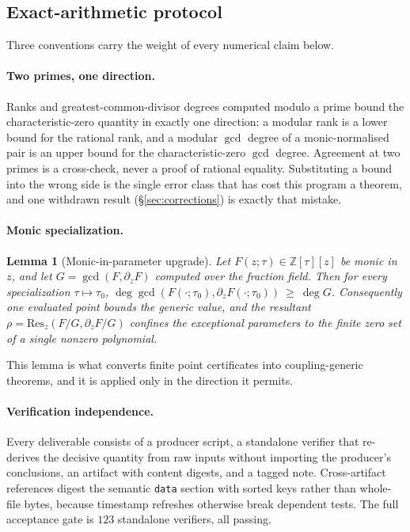 \documentclass[11pt]{article}
\newtheorem{lemma}[theorem]{Lemma}
\theoremstyle{definition}
\newcommand{\Zb}{\mathbb{Z}}
\begin{document}
\subsection{Exact-arithmetic protocol}\label{sec:protocol}
Three conventions carry the weight of every numerical claim below.

\paragraph{Two primes, one direction.}
Ranks and greatest-common-divisor degrees computed modulo a prime bound the characteristic-zero
quantity in exactly one direction: a modular rank is a lower bound for the rational rank, and a
modular $\gcd$ degree of a monic-normalised pair is an upper bound for the characteristic-zero
$\gcd$ degree. Agreement at two primes is a cross-check, never a proof of rational equality.
Substituting a bound into the wrong side is the single error class that has cost this program a
theorem, and one withdrawn result (\S\ref{sec:corrections}) is exactly that mistake.

\paragraph{Monic specialization.}
\begin{lemma}[Monic-in-parameter upgrade]\label{lem:monic}
Let $F(z;\tau)\in\Zb[\tau][z]$ be monic in $z$, and let $G=\gcd(F,\partial_zF)$ computed over the
fraction field. Then for every specialization $\tau\mapsto\tau_0$, $\deg\gcd(F(\cdot;\tau_0),
\partial_zF(\cdot;\tau_0))\ \ge\ \deg G$. Consequently one evaluated point bounds the generic value,
and the resultant $\rho=\mathrm{Res}_z(F/G,\partial_zF/G)$ confines the exceptional parameters to the
finite zero set of a single nonzero polynomial.
\end{lemma}
This lemma is what converts finite point certificates into coupling-generic theorems, and it is
applied only in the direction it permits.

\paragraph{Verification independence.}
Every deliverable consists of a producer script, a standalone verifier that re-derives the decisive
quantity from raw inputs without importing the producer's conclusions, an artifact with content
digests, and a tagged note. Cross-artifact references digest the semantic \texttt{data} section with
sorted keys rather than whole-file bytes, because timestamp refreshes otherwise break dependent
tests. The full acceptance gate is $123$ standalone verifiers, all passing.
\end{document}
